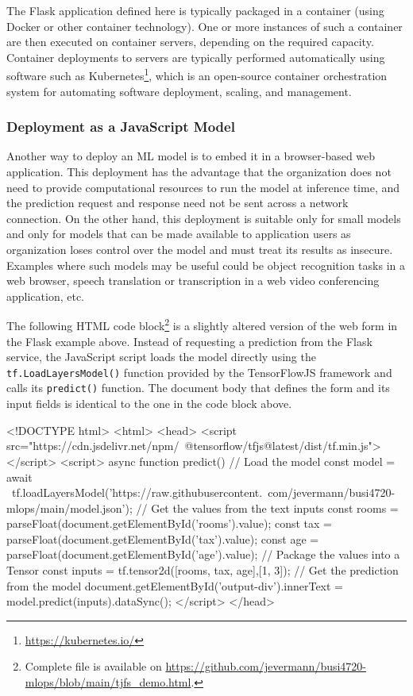 The Flask application defined here is typically packaged in a container (using Docker or other container technology). One or more instances of such a container are then executed on container servers, depending on the required capacity. Container deployments to servers are typically performed automatically using software such as Kubernetes\footnote{\url{https://kubernetes.io/}}, which is an open-source container orchestration system for automating software deployment, scaling, and management. 

\subsubsection*{Deployment as a JavaScript Model}

Another way to deploy an ML model is to embed it in a browser-based web application. This deployment has the advantage that the organization does not need to provide computational resources to run the model at inference time, and the prediction request and response need not be sent across a network connection. On the other hand, this deployment is suitable only for small models and only for models that can be made available to application users as organization loses control over the model and must treat its results as insecure. Examples where such models may be useful could be object recognition tasks in a web browser, speech translation or transcription in a web video conferencing application, etc. 

The following HTML code block\footnote{Complete file is available on \url{https://github.com/jevermann/busi4720-mlops/blob/main/tjfs_demo.html}.} is a slightly altered version of the web form in the Flask example above. Instead of requesting a prediction from the Flask service, the JavaScript script loads the model directly using the \texttt{tf.LoadLayersModel()} function provided by the TensorFlowJS framework and calls its \texttt{predict()} function. The document body that defines the form and its input fields is identical to the one in the code block above. 

\begin{htmlcode}
<!DOCTYPE html>
<html>
 <head>
  <script src="https://cdn.jsdelivr.net/npm/\
     @tensorflow/tfjs@latest/dist/tf.min.js"></script>
  <script>
   async function predict() {
    // Load the model
    const model = await \
     tf.loadLayersModel('https://raw.githubusercontent.\
      com/jevermann/busi4720-mlops/main/model.json');
    // Get the values from the text inputs
    const rooms = parseFloat(document.getElementById('rooms').value);
    const tax = parseFloat(document.getElementById('tax').value);
    const age = parseFloat(document.getElementById('age').value);
    // Package the values into a Tensor
    const inputs = tf.tensor2d([rooms, tax, age],[1, 3]);
    // Get the prediction from the model
    document.getElementById('output-div').innerText = 
     model.predict(inputs).dataSync();
   }
  </script>
 </head>
\end{htmlcode}

